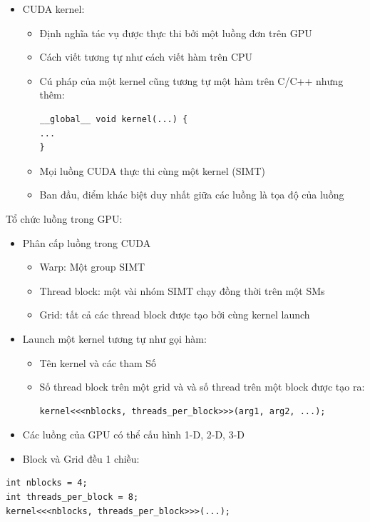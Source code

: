 \documentclass[14pt, a4paper]{article}
\numberwithin{equation}{section}
\numberwithin{figure}{section}
\numberwithin{dl}{section}
\numberwithin{md}{section}
\numberwithin{bd}{section}
\numberwithin{dn}{section}
\numberwithin{hq}{section}
\begin{document}
\begin{itemize}
    \item CUDA kernel:
    \begin{itemize}
        \item Định nghĩa tác vụ được thực thi bởi một luồng đơn trên GPU
        \item Cách viết tương tự như cách viết hàm trên CPU
        \item Cú pháp của một kernel cũng tương tự một hàm trên C/C++ nhưng thêm:
        \begin{verbatim}
__global__ void kernel(...) {
...
}
        \end{verbatim}
        \item Mọi luồng CUDA thực thi cùng một kernel (SIMT)
        \item Ban đầu, điểm khác biệt duy nhất giữa các luồng là tọa độ của luồng
    \end{itemize}
\end{itemize}

Tổ chức luồng trong GPU:

\begin{itemize}
    \item Phân cấp luồng trong CUDA 
    \begin{itemize}
        \item Warp: Một group SIMT
        \item Thread block: một vài nhóm SIMT chạy đồng thời trên một SMs
        \item Grid: tất cả các thread block được tạo bởi cùng kernel launch
    \end{itemize}
    \item Launch một kernel tương tự như gọi hàm:
    \begin{itemize}
        \item Tên kernel và các tham Số
        \item Số thread block trên một grid và và số thread trên một block được tạo ra:
        \begin{verbatim}
kernel<<<nblocks, threads_per_block>>>(arg1, arg2, ...);                
        \end{verbatim}
    \end{itemize}
\end{itemize}

\begin{itemize}
    \item Các luồng của GPU có thể cấu hình 1-D, 2-D, 3-D
    \item Block và Grid đều 1 chiều:
\end{itemize}
\begin{verbatim}
int nblocks = 4;
int threads_per_block = 8;
kernel<<<nblocks, threads_per_block>>>(...);
\end{verbatim}
\end{document}
